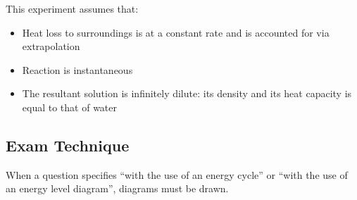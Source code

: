 \documentclass[../main]{subfiles}
\begin{document}
	This experiment assumes that:
	\begin{itemize}
		\item Heat loss to surroundings is at a constant rate and is accounted for via extrapolation
		\item Reaction is instantaneous
		\item The resultant solution is infinitely dilute: its density and its heat capacity  is equal to that of water
	\end{itemize}

	\subsection{Exam Technique}

	When a question specifies ``with the use of an energy cycle'' or ``with the use of an energy level diagram'', diagrams must be drawn.
\end{document}
